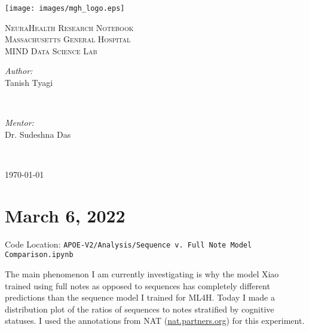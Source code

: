 \documentclass[11pt,letterpaper]{article}
\begin{document}
\begin{titlepage}

\newcommand{\HRule}{\rule{\linewidth}{0.5mm}} %

\center
\texttt{[image: images/mgh\_logo.eps]}\\[1cm] %
 
\center %

\textsc{\LARGE NeuraHealth Research Notebook}\\[1.5cm] %
\textsc{\Large Massachusetts General Hospital}\\[0.5cm] %
\textsc{\large MIND Data Science Lab}\\[0.5cm] %

\begin{minipage}{0.4\textwidth}
\begin{flushleft} \large
\emph{Author:}\\
Tanish Tyagi %
\end{flushleft}
\end{minipage}
~
\begin{minipage}{0.4\textwidth}
\begin{flushright} \large
\emph{Mentor:} \\
Dr. Sudeshna Das \\[1.2em] %
\end{flushright}
\end{minipage}\\[2cm]
\makeatother

{\large \today}\\[2cm]

\vfill

\end{titlepage}

\section{March 6, 2022}

Code Location: \texttt{APOE-V2/Analysis/Sequence v. Full Note Model Comparison.ipynb}

The main phenomenon I am currently investigating is why the model Xiao trained using full notes as opposed to sequences has completely different predictions than the sequence model I trained for ML4H. Today I made a distribution plot of the ratios of sequences to notes stratified by cognitive statuses. I used the annotations from NAT (\url{nat.partners.org}) for this experiment. 
\end{document}
